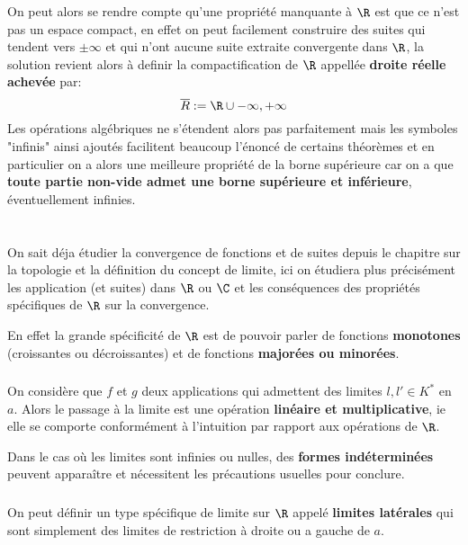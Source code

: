 \subsection*{}
On peut alors se rendre compte qu'une propriété manquante à \(\R\) est que ce n'est pas un espace compact, en effet on peut facilement construire des suites qui tendent vers \(\pm \infty\) et qui n'ont aucune suite extraite convergente dans \(\R\), la solution revient alors à definir la compactification de \(\R\) appellée \textbf{droite réelle achevée} par:
\[
   \overline{R} := \R \cup {-\infty, +\infty}
\]
Les opérations algébriques ne s'étendent alors pas parfaitement mais les symboles "infinis" ainsi ajoutés facilitent beaucoup l'énoncé de certains théorèmes et en particulier on a alors une meilleure propriété de la borne supérieure car on a que \textbf{toute partie non-vide admet une borne supérieure et inférieure}, éventuellement infinies.
\chapter*{} %
On sait déja étudier la convergence de fonctions et de suites depuis le chapitre sur la topologie et la définition du concept de limite, ici on étudiera plus précisément les application (et suites) dans \(\R\) ou \(\C\) et les conséquences des propriétés spécifiques de \(\R\) sur la convergence.\<

En effet la grande spécificité de \(\R\) est de pouvoir parler de fonctions \textbf{monotones} (croissantes ou décroissantes) et de fonctions \textbf{majorées ou minorées}.

\subsection*{}
On considère que \(f\) et \(g\) deux applications qui admettent des limites \(l, l' \in K^*\) en \(a\).\+
Alors le passage à la limite est une opération \textbf{linéaire et multiplicative}, ie elle se comporte conformément à l'intuition par rapport aux opérations de \(\R\).\<

Dans le cas où les limites sont infinies ou nulles, des \textbf{formes indéterminées} peuvent apparaître et nécessitent les précautions usuelles pour conclure.
\subsection*{}
On peut définir un type spécifique de limite sur \(\R\) appelé \textbf{limites latérales} qui sont simplement des limites de restriction à droite ou a gauche de \(a\).\<

